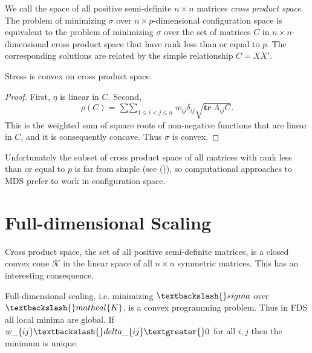 \documentclass[
  12pt,
  letterpaper,
  DIV=11,
  numbers=noendperiod]{scrreprt}
\newenvironment{Shaded}{\begin{snugshade}}{\end{snugshade}}
\newcommand{\NormalTok}[1]{\textcolor[rgb]{0.00,0.23,0.31}{#1}}
\theoremstyle{remark}
\begin{document}
We call the space of all positive semi-definite \(n\times n\) matrices
\emph{cross product space}. The problem of minimizing \(\sigma\) over
\(n\times p\)-dimensional configuration space is equivalent to the
problem of minimizing \(\sigma\) over the set of matrices \(C\) in
\(n\times n\)-dimensional cross product space that have rank less than
or equal to \(p\). The corresponding solutions are related by the simple
relationship \(C=XX'\).

\begin{Shaded}
\begin{Highlighting}[]
\NormalTok{Stress is convex on cross product space.}
\end{Highlighting}
\end{Shaded}

\begin{proof}
First, \(\eta\) is linear in \(C\). Second, \[
\rho(C)=\mathop{\sum\sum}_{1\leq i<j\leq n} w_{ij}\delta_{ij}\sqrt{\mathbf{tr}\ A_{ij}C}.
\] This is the weighted sum of square roots of non-negative functions
that are linear in \(C\), and it is consequently concave. Thus
\(\sigma\) is convex.
\end{proof}

Unfortunately the subset of cross product space of all matrices with
rank less than or equal to \(p\) is far from simple (see
()), so computational
approaches to MDS prefer to work in configuration space.

\section{Full-dimensional Scaling}\label{full-dimensional-scaling}

Cross product space, the set of all positive semi-definite matrices, is
a closed convex cone \(\mathcal{K}\) in the linear space of all
\(n\times n\) symmetric matrices. This has an interesting consequence.

\begin{Shaded}
\begin{Highlighting}[]
\NormalTok{Full{-}dimensional scaling, i.e. minimizing $\textbackslash{}sigma$ over $\textbackslash{}mathcal\{K\}$, is a convex programming problem. Thus in FDS all local minima are global. If $w\_\{ij\}\textbackslash{}delta\_\{ij\}\textgreater{}0$ for all $i,j$ then the minimum is unique.}
\end{Highlighting}
\end{Shaded}
\end{document}
